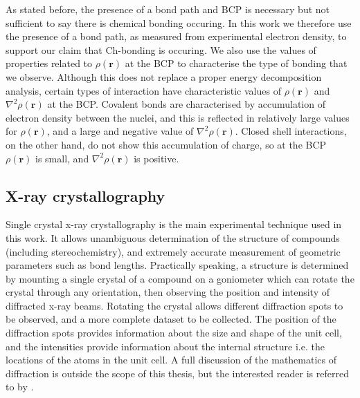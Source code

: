 \begin{refsection}
As stated before, the presence of a bond path and BCP is necessary but not sufficient to say there is chemical bonding occuring.
In this work we therefore use the presence of a bond path, as measured from experimental electron density, to support our claim that Ch-bonding is occuring.
We also use the values of properties related to $\rho(\textbf{r})$ at the BCP to characterise the type of bonding that we observe.
Although this does not replace a proper energy decomposition analysis, certain types of interaction have characteristic values of $\rho(\textbf{r})$ and $\nabla^{2}\rho(\textbf{r})$ at the BCP.
Covalent bonds are characterised by accumulation of electron density between the nuclei, and this is reflected in relatively large values for $\rho(\textbf{r})$, and a large and negative value of $\nabla^{2}\rho(\textbf{r})$.
Closed shell interactions, on the other hand, do not show this accumulation of charge, so at the BCP $\rho(\textbf{r})$ is small, and $\nabla^{2}\rho(\textbf{r})$ is positive.

\subsection{X-ray crystallography}
Single crystal x-ray crystallography is the main experimental technique used in this work.
It allows unambiguous determination of the structure of compounds (including stereochemistry), and  extremely accurate measurement of geometric parameters such as bond lengths.
Practically speaking, a structure is determined by mounting a single crystal of a compound on a goniometer which can rotate the crystal through any orientation, then observing the position and intensity of diffracted x-ray beams.
Rotating the crystal allows different diffraction spots to be observed, and a more complete dataset to be collected.
The position of the diffraction spots provides information about the size and shape of the unit cell, and the intensities provide information about the internal structure i.e. the locations of the atoms in the unit cell.
A full discussion of the mathematics of diffraction is outside the scope of this thesis, but the interested reader is referred to  by \citeauthor{Stout1989}.\autocite{Stout1989}


\end{refsection}
